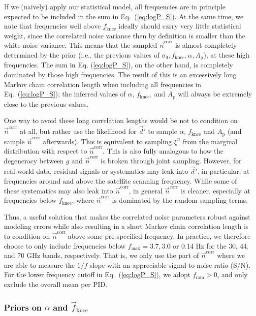 \documentclass{aa}
\renewcommand{\d}[0]{\vec{d}}
\newcommand{\n}[0]{\vec{n}}
\newcommand{\f}[0]{\vec{f}}
\begin{document}
If we (naively) apply our statistical model, all frequencies are in
principle expected to be included in the sum in Eq.~(\ref{eq:logP_S}).  At the
same time, we note that frequencies well above $f_{\mathrm{knee}}$
ideally should carry very little statistical weight, since the
correlated noise variance then by definition is smaller than the white
noise variance.  This means that the sampled $\n^\mathrm{corr}$ is
almost completely determined by the prior (i.e., the previous values of
$\sigma_0, f_\mathrm{knee}, \alpha, A_\mathrm{p}$), at these high frequencies. The
sum in Eq. (\ref{eq:logP_S}), on the other hand, is completely
dominated by those high frequencies. The result of this is an
excessively long Markov chain correlation length when including all
frequencies in Eq.~(\ref{eq:logP_S}); the inferred values of $\alpha$, $f_\mathrm{knee}$, and $A_\mathrm{p}$ will always be extremely close to the previous values.

One way to avoid these long correlation lengths would be not to 
condition on $\n^\mathrm{corr}$ at all, but rather use the likelihood for 
$\d'$ to sample $\alpha$, $f_\mathrm{knee}$ and $A_\mathrm{p}$ (and sample 
$\n^\mathrm{corr}$ afterwards). This is equivalent to sampling $\xi^n$
from the marginal distribution with respect to $\n^{\mathrm{corr}}$.
This is also fully analogous to how the degeneracy between $g$ and
$\n^{\mathrm{corr}}$ is broken through joint sampling. However, 
for real-world data, residual signals or
systematics may leak into $\d'$, in particular, at frequencies around
and above the satellite scanning frequency. While some of these 
systematics may also leak into $\n^\mathrm{corr}$, in general 
$\n^\mathrm{corr}$ is cleaner, especially at frequencies 
below $f_\mathrm{knee}$, where $\n^\mathrm{corr}$ is dominated
by the random sampling terms. 

Thus, a useful solution that makes the correlated noise
parameters robust against modeling errors while also resulting in a short
Markov chain correlation length is to condition on
$\n^\mathrm{corr}$ above some pre-specified frequency. In practice, we
therefore choose to only include frequencies below
$f_\mathrm{max} = 3.7, 3.0$ or 0.14 Hz for the 30, 44, and 70 GHz bands, 
respectively.
That is, we only use the part of
$\n^\mathrm{corr}$ where we are able to measure the $1/f$ slope with
an appreciable signal-to-noise ratio (S/N). For the lower frequency cutoff
in Eq.~(\ref{eq:logP_S}), we adopt $f_{\mathrm{min}}>0$, and only
exclude the overall mean per PID.

\subsubsection{Priors on $\alpha$ and $\f_\mathrm{knee}$}
\end{document}
